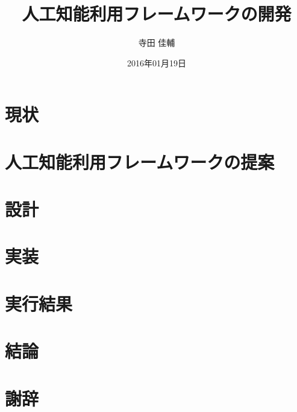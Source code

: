 \documentclass[a4paper,10pt,onecolumn,oneside,openany]{jsbook}
\author{寺田 佳輔}										%
\title{人工知能利用フレームワークの開発}				%
\date{2016年01月19日}									%
\begin{document}



\chapter{現状}




\chapter{人工知能利用フレームワークの提案}



\chapter{設計}


\chapter{実装}

\chapter{実行結果}

\chapter{結論}


\chapter*{謝辞}



\end{document}
